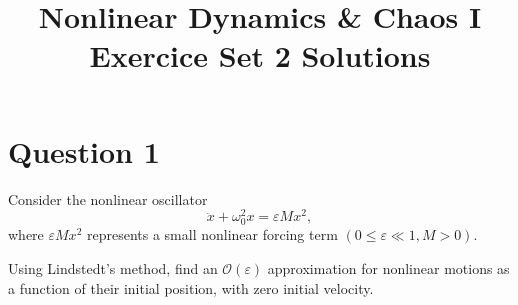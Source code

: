 \documentclass[twoside,10pt,a4paper]{article}
\title{\huge \textbf{Nonlinear Dynamics \& Chaos I \\ \Large Exercice Set 2 Solutions}}	%
\author{ }		%
\date{ }	%
\begin{document}
\maketitle

\section*{Question 1}
Consider the nonlinear oscillator
\begin{equation*}
	\ddot{x} + \omega_0^2 x= \varepsilon Mx^2,
\end{equation*}
where $\varepsilon M x^2$ represents a small nonlinear forcing term $(0 \leq \varepsilon \ll 1, M > 0)$.

Using Lindstedt's method, find an $\mathcal{O}(\varepsilon)$ approximation for nonlinear motions as a function of their initial position, with zero initial velocity.
\end{document}
